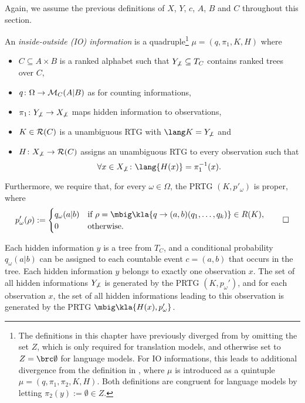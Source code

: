 Again, we assume the previous definitions of $X$, $Y$, $c$, $A$, $B$ and $C$
throughout this section.

\begin{definition}\label{02:def-io-info}
 An \emph{inside-outside (IO) information} is a quadruple\footnote{The definitions
 in this chapter have previously diverged from \cite{bucstuvog15} by omitting
 the set $Z$, which is only required for translation models, and otherwise set
 to $Z=\brc\emptyset$ for language models. For IO informations, this leads to
 additional divergence from the definition in \cite{bucstuvog15}, where $\mu$
 is introduced as a quintuple $\mu=(q,\pi_1,\pi_2,K,H)$. Both definitions are
 congruent for language models by letting $\pi_2(y) :=
 \emptyset\in Z$.} $\mu = (q,\pi_1,K,H)$ where
 \begin{itemize}\setlength\itemsep{-0.3em}
  \item $C\subseteq A\times B$ is a ranked alphabet such that $Y_{\not\bot}\subseteq T_C$ contains ranked trees over $C$,
  \item $q\colon\Omega\to\mathcal M_C(A|B)$ as for counting informations,
  \item $\pi_1\colon Y_{\not\bot}\to X_{\not\bot}$ maps hidden information to observations,
  \item $K\in\mathcal R(C)$ is a unambiguous RTG with $\lang K = Y_{\not\bot}$ and
  \item $H\colon X_{\not\bot}\to\mathcal R(C)$ assigns an unambiguous RTG to every observation such that 
   \[
    \forall x\in X_{\not\bot}\colon \lang{H(x)} = \pi_1^{-1}(x).
   \]
 \end{itemize}
 Furthermore, we require that, for every $\omega\in\Omega$, the PRTG $(K,p'_\omega)$ is proper, where
 \[
  p'_\omega(\rho) := \begin{cases}
   q_\omega(a|b) & \text{if } \rho=\mbig\kla{q\to(a,b)(q_1,\ldots,q_k)}\in R(K),
   \\ 0 & \text{otherwise}.
  \end{cases}\qedhere
 \]
\end{definition}

Each hidden information $y$ is a tree from $T_C$, and a conditional probability
$q_\omega(a|b)$ can be assigned to each countable event $c = (a,b)$ that occurs
in the tree. Each hidden information $y$ belongs to exactly one observation
$x$. The set of all hidden informations $Y_{\not\bot}$ is generated by the PRTG
$(K,p_\omega')$, and for each observation $x$, the set of all hidden
informations leading to this observation is generated by the PRTG
$\mbig\kla{H(x),p_\omega'}$.


